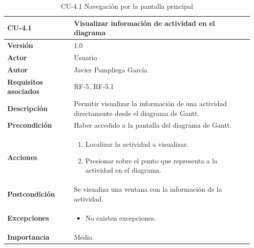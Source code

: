 \begin{table}[p]
	\centering
	\begin{tabularx}{\linewidth}{ p{} p{} }
		\toprule
		\textbf{CU-4.1}    & \textbf{Visualizar información de actividad en el diagrama}\\
		\toprule
		\textbf{Versión}              & 1.0    \\
            \textbf{Actor}                & Usuario \\
		\textbf{Autor}                & Javier Pampliega García \\
		\textbf{Requisitos asociados} & RF-5, RF-5.1\\
		\textbf{Descripción}          & Permitir visualizar la información de una actividad directamente desde el diagrama de Gantt. \\
		\textbf{Precondición}         & Haber accedido a la pantalla del diagrama de Gantt. \\
		\textbf{Acciones}             &
		\begin{enumerate}
			\def\labelenumi{\arabic{enumi}.}
			\tightlist
			\item Localizar la actividad a visualizar.
                \item Presionar sobre el punto que representa a la actividad en el diagrama.
		\end{enumerate}\\
		\textbf{Postcondición}        & Se visualiza una ventana con la información de la actividad. \\
		\textbf{Excepciones}          & \begin{itemize}
		    \item No existen excepciones.
		\end{itemize} \\
		\textbf{Importancia}          & Media \\
		\bottomrule
	\end{tabularx}
	\caption{CU-4.1 Navegación por la pantalla principal}
\end{table}

